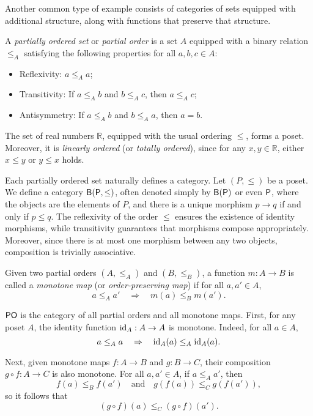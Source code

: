 Another common type of example consists of categories of sets equipped with additional structure, along with functions that preserve that structure.


\begin{definition}
A \emph{partially ordered set} or \emph{partial order} is a set $A$ equipped with a binary relation $\leq_A$ satisfying the following properties for all $a, b, c \in A$:
\begin{itemize}
    \item Reflexivity: $a \leq_A a$;
    \item Transitivity: If $a \leq_A b$ and $b \leq_A c$, then $a \leq_A c$;
    \item Antisymmetry: If $a \leq_A b$ and $b \leq_A a$, then $a = b$.
\end{itemize}
\end{definition}

\begin{example}
The set of real numbers \(\mathbb{R}\), equipped with the usual ordering \(\leq\), forms a poset. Moreover, it is \emph{linearly ordered} (or \emph{totally ordered}), since for any \(x, y \in \mathbb{R}\), either \(x \leq y\) or \(y \leq x\) holds.
\end{example}

\begin{example}
  Each partially ordered set naturally defines a category. Let \( (P, \leq) \) be a poset. We define a category \( \mathsf{B(P, \leq)} \), often denoted simply by \( \mathsf{B(P)} \) or even \( \mathsf{P} \), where the objects are the elements of \( P \), and there is a unique morphism \( p \to q \) if and only if \( p \leq q \). The reflexivity of the order \( \leq \) ensures the existence of identity morphisms, while transitivity guarantees that morphisms compose appropriately. Moreover, since there is at most one morphism between any two objects, composition is trivially associative. 
\end{example}

\begin{definition}
Given two partial orders \((A, \leq_A)\) and \((B,\leq_B)\), a function \(m: A \to B\) is called a \emph{monotone map} (or \emph{order-preserving map}) if for all \(a, a' \in A\),
\[
a \leq_A a' \quad \Rightarrow \quad m(a) \leq_B m(a').
\]
\end{definition}



\begin{example}
  $\mathsf{PO}$ is the category of all partial orders and all monotone maps. First, for any poset \(A\), the identity function \(\mathrm{id}_A : A \to A\) is monotone. Indeed, for all \(a \in A\),
\[
a \leq_A a \quad \Rightarrow \quad \mathrm{id}_A(a) \leq_A \mathrm{id}_A(a).
\]

Next, given monotone maps \(f : A \to B\) and \(g : B \to C\), their composition \(g \circ f : A \to C\) is also monotone. For all \(a, a' \in A\), if \(a \leq_A a'\), then
\[
f(a) \leq_B f(a') \quad \text{and} \quad g(f(a)) \leq_C g(f(a')),
\]
so it follows that
\[
(g \circ f)(a) \leq_C (g \circ f)(a').
\]

\end{example}



